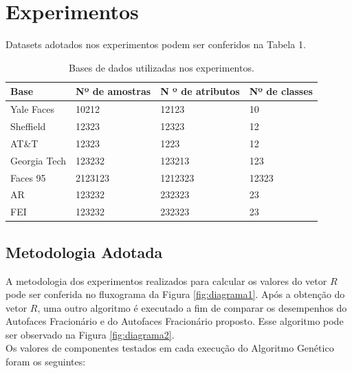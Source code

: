 \documentclass[12pt]{article}
\begin{document}
\section{Experimentos}

Datasets adotados nos experimentos podem ser conferidos na Tabela 1.

\begin{table}[] \centering
\scriptsize
\begin{tabular}{|l|l|l|l|}
\hline
\textbf{Base} & \multicolumn{1}{r|}{\textbf{Nº de amostras}} & \textbf{N º de atributos} & \textbf{Nº de classes} \\ \hline
Yale Faces       & 10212                                        & 12123                     & 10                     \\ \hline
Sheffield        & 12323                                        & 12323                     & 12                     \\ \hline
AT\&T            & 12323                                        & 1223                      & 12                     \\ \hline
Georgia Tech     & 123232                                       & 123213                    & 123                    \\ \hline
Faces 95         & 2123123                                      & 1212323                   & 12323                  \\ \hline
AR               & 123232                                       & 232323                    & 23                     \\ \hline
FEI               & 123232                                       & 232323                    & 23                     \\ \hline
\end{tabular}
\caption{Bases de dados utilizadas nos experimentos.}
\end{table}

\subsection{Metodologia Adotada}
A metodologia dos experimentos realizados para calcular os valores do vetor $R$ pode ser conferida no fluxograma da Figura \ref{fig:diagrama1}. Após a obtenção do vetor $R$, uma outro algoritmo é executado a fim de comparar os desempenhos do Autofaces Fracionário e do Autofaces Fracionário proposto. Esse algoritmo pode ser observado na Figura \ref{fig:diagrama2}.\\
\indent Os valores de componentes testados em cada execução do Algoritmo Genético foram os seguintes:
\end{document}
